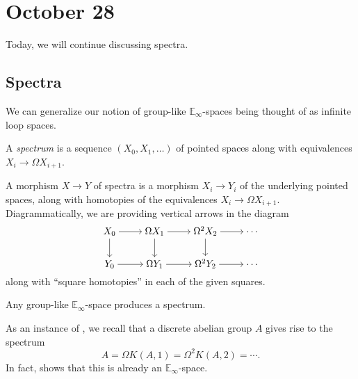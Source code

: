 \documentclass[../notes.tex]{subfiles}
\begin{document}
\section{October 28}
Today, we will continue discussing spectra.

\subsection{Spectra}
We can generalize our notion of group-like $\mathbb E_\infty$-spaces being thought of as infinite loop spaces.
\begin{definition}[spectrum]
	A \textit{spectrum} is a sequence $(X_0,X_1,\ldots)$ of pointed spaces along with equivalences $X_i\to\Omega X_{i+1}$.
\end{definition}
\begin{remark}
	A morphism $X\to Y$ of spectra is a morphism $X_i\to Y_i$ of the underlying pointed spaces, along with homotopies of the equivalences $X_i\to\Omega X_{i+1}$. Diagrammatically, we are providing vertical arrows in the diagram
	\[\begin{tikzcd}[cramped]
		{X_0} & {\Omega X_1} & {\Omega^2X_2} & \cdots \\
		{Y_0} & {\Omega Y_1} & {\Omega^2 Y_2} & \cdots
		\arrow[from=1-1, to=1-2]
		\arrow[from=1-1, to=2-1]
		\arrow[from=1-2, to=1-3]
		\arrow[from=1-2, to=2-2]
		\arrow[from=1-3, to=1-4]
		\arrow[from=1-3, to=2-3]
		\arrow[from=2-1, to=2-2]
		\arrow[from=2-2, to=2-3]
		\arrow[from=2-3, to=2-4]
	\end{tikzcd}\]
	along with ``square homotopies'' in each of the given squares.
\end{remark}
\begin{example} \label{ex:e-inf-is-spectra}
	Any group-like $\mathbb E_\infty$-space produces a spectrum.
\end{example}
\begin{example}
	As an instance of , we recall that a discrete abelian group $A$ gives rise to the spectrum
	\[A=\Omega K(A,1)=\Omega^2K(A,2)=\cdots.\]
	In fact,  shows that this is already an $\mathbb E_\infty$-space.
\end{example}
\end{document}
